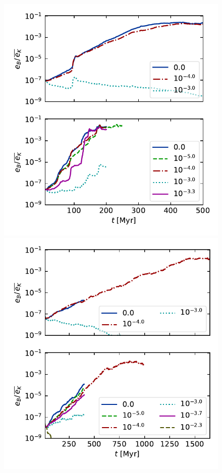 \documentclass[preprint2]{aastex63}
\begin{document}
{\begin{figure}
  \includegraphics[trim=0.5cm 0.0cm 0.3cm 0.0cm, clip=true,width=\columnwidth]{figs/2pc-eB-nu5.pdf}
  \includegraphics[trim=0.5cm 0.0cm 0.3cm 0.0cm, clip=true,width=\columnwidth]{figs/4pc-eB-nu6.pdf}

\end{figure}}
\end{document}
